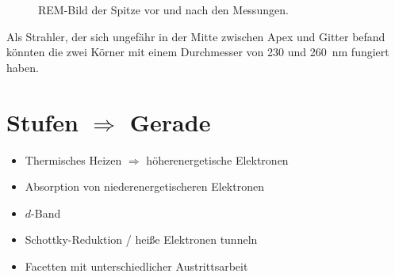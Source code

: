 \documentclass[bachelor,       %
               twoside,        %
               BCOR10mm,       %
               english,ngerman, %
               ]{GAUBM}
\begin{document}
\begin{figure}[h!]
  \centering
  \hfill
  \hfill
  \caption{REM-Bild der Spitze vor und nach den Messungen.}
  \label{fig:rem}
\end{figure}

Als Strahler, der sich ungefähr in der Mitte zwischen Apex und Gitter befand könnten die zwei Körner mit einem Durchmesser von 230 und \SI{260}{\nm} fungiert haben.




\section{Stufen $\Rightarrow$ Gerade}
\begin{itemize}
\item Thermisches Heizen $\Rightarrow$ höherenergetische Elektronen
\item Absorption von niederenergetischeren Elektronen
\item $d$-Band
\item Schottky-Reduktion / heiße Elektronen tunneln
\item Facetten mit unterschiedlicher Austrittsarbeit
\end{itemize}
\end{document}
